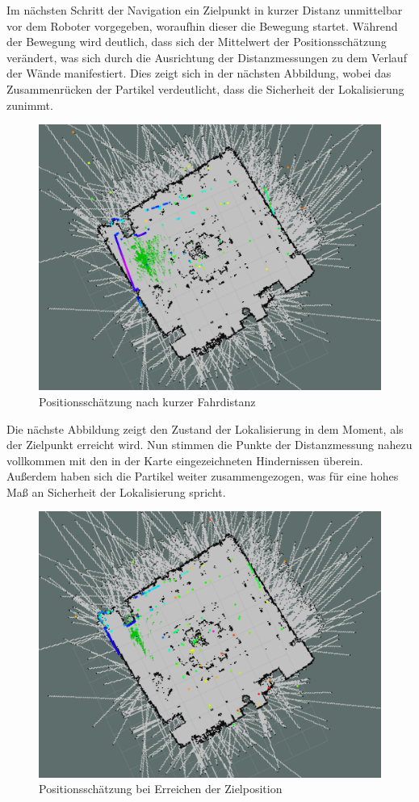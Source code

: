 Im nächsten Schritt der Navigation ein Zielpunkt in kurzer Distanz unmittelbar vor dem Roboter vorgegeben, woraufhin dieser die Bewegung startet. Während der Bewegung wird deutlich, dass sich der Mittelwert der Positionsschätzung verändert, was sich durch die Ausrichtung der Distanzmessungen zu dem Verlauf der Wände manifestiert. Dies zeigt sich in der nächsten Abbildung, wobei das Zusammenrücken der Partikel verdeutlicht, dass die Sicherheit der Lokalisierung zunimmt.
\begin{figure}[!ht]
\centering
\includegraphics[width=0.7\linewidth, trim={4cm 5cm 12cm 6cm}, clip]{img/Experiment3_Lokalisierung_3.png}
\caption{Positionsschätzung nach kurzer Fahrdistanz}
\end{figure}

Die nächste Abbildung zeigt den Zustand der Lokalisierung in dem Moment, als der Zielpunkt erreicht wird. Nun stimmen die Punkte der Distanzmessung nahezu vollkommen mit den in der Karte eingezeichneten Hindernissen überein. Außerdem haben sich die Partikel weiter zusammengezogen, was für eine hohes Maß an Sicherheit der Lokalisierung spricht.
\begin{figure}[!ht]
\centering
\includegraphics[width=0.7\linewidth, trim={4cm 5cm 12cm 6cm}, clip]{img/Experiment3_Lokalisierung_4.png}
\caption{Positionsschätzung bei Erreichen der Zielposition}
\end{figure}


